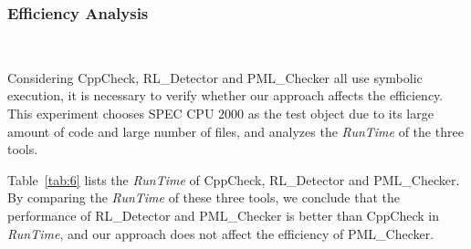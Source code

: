 \subsubsection{Efficiency Analysis} 

\ 

Considering CppCheck, RL\_Detector and PML\_Checker all use symbolic execution, it is necessary to verify whether our approach affects the efficiency. This experiment chooses SPEC CPU $2000$ as the test object due to its large amount of code and large number of files, and analyzes the \textit{RunTime} of the three tools. 

Table~\ref{tab:6} lists the \textit{RunTime} of CppCheck, RL\_Detector and PML\_Checker. By comparing the \textit{RunTime} of these three tools, we conclude that the performance of RL\_Detector and PML\_Checker is better than CppCheck in \textit{RunTime}, and our approach does not affect the efficiency of PML\_Checker.

